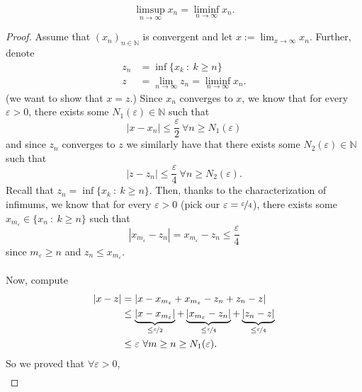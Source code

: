 \documentclass{article}
\newcommand{\N}{\mathbb{N}}
\newcommand{\seq}[2]{(#1_{#2})_{#2 \in \N}}
\newcommand{\mylim}[2]{\lim_{#1 \to #2}}
\newcommand{\?}{\stackrel{?}{=}}
\theoremstyle{definition} %
\begin{document}
\begin{itemize}
\begin{theorem}
              $$\limsup_{n \to \infty} x_n = \liminf_{n \to \infty} x_n.$$
          \end{theorem}
          \begin{proof}
              Assume that $\seq{x}{n}$ is convergent and let $x := \mylim{x}{\infty} x_n$. Further, denote
              \begin{align*}
                  z_n & = \inf\{x_k \ : \ k \geq n\}                          \\
                  z   & = \mylim{n}{\infty} z_n = \liminf_{n \to \infty} x_n.
              \end{align*}
              (we want to show that $x = z$.)
              Since $x_n$ converges to $x$, we know that for every $\varepsilon > 0$, there exists some $N_1(\varepsilon) \in \N$ such that
              $$|x - x_n| \leq \frac{\varepsilon}{2} \ \forall n \geq N_1(\varepsilon)$$
              and since $z_n$ converges to $z$ we similarly have that there exists some $N_2(\varepsilon) \in \N$ such that
              $$|z - z_n| \leq \frac{\varepsilon}{4} \ \forall n \geq N_2(\varepsilon).$$
              Recall that $z_n = \inf\{x_k \ : \ k \geq n\}$. Then, thanks to the characterization of infimums, we know that for every $\varepsilon > 0$ (pick our $\varepsilon = \nicefrac{\varepsilon}{4}$), there exists some $x_{m_\varepsilon} \in \{x_n \ : \ k \geq n\}$ such that
              $$|x_{m_\varepsilon} - z_n| = x_{m_\varepsilon} - z_n \leq \frac{\varepsilon}{4}$$
              since $m_\varepsilon \geq n$ and $z_n \leq x_{m_\varepsilon}$. \\\\
              Now, compute
              \begin{align*}
                  |x - z| & = |x - x_{m_\varepsilon} + x_{m_\varepsilon} - z_n + z_n - z|                                                                                                                                                  \\
                          & \leq \underbrace{|x - x_{m_\varepsilon}|}_{\leq \nicefrac{\varepsilon}{2}} + \underbrace{|x_{m_\varepsilon} - z_n|}_{\leq \nicefrac{\varepsilon}{4}} + \underbrace{|z_n - z|}_{\leq \nicefrac{\varepsilon}{4}} \\
                          & \leq \varepsilon \ \forall m \geq n \geq N_1(\varepsilon).
              \end{align*}
              So we proved that $\forall \varepsilon > 0$,
              \begin{align*}

\end{align*}
\end{proof}
\end{itemize}
\end{document}
